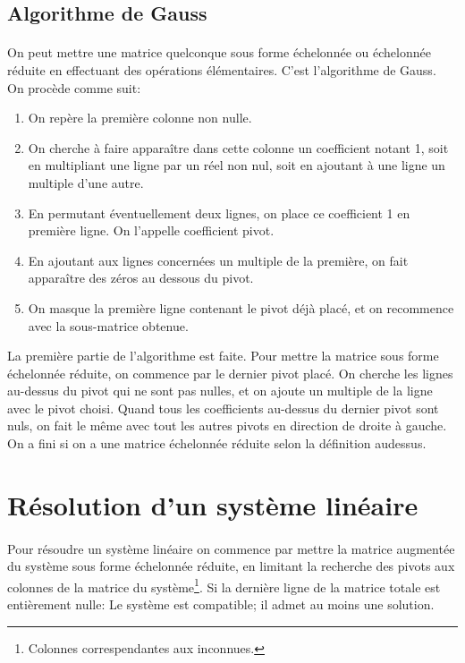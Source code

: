 %
\subsection{Algorithme de Gauss}
%
\paragraph{} On peut mettre une matrice quelconque sous forme échelonnée ou échelonnée réduite en effectuant des opérations élémentaires. C'est l'algorithme de Gauss. \\
On procède comme suit:
\begin{enumerate}
  \item On repère la première colonne non nulle.
  \item On cherche à faire apparaître dans cette colonne un coefficient notant 1, soit en multipliant une ligne par un réel non nul, soit en ajoutant à une ligne un multiple d'une autre.
  \item En permutant éventuellement deux lignes, on place ce coefficient 1 en première ligne. On l'appelle coefficient pivot.
  \item En ajoutant aux lignes concernées un multiple de la première, on fait apparaître des zéros au dessous du pivot. 
  \item On masque la première ligne contenant le pivot déjà placé, et on recommence avec la sous-matrice obtenue.
\end{enumerate}
La première partie de l'algorithme est faite. Pour mettre la matrice sous forme échelonnée réduite, on commence par le dernier pivot placé. On cherche les lignes au-dessus du pivot qui ne sont pas nulles, et on ajoute un multiple de la ligne avec le pivot choisi. Quand tous les coefficients au-dessus du dernier pivot sont nuls, on fait le même avec tout les autres pivots en direction de droite à gauche. On a fini si on a une matrice échelonnée réduite selon la définition audessus.

%
\section{Résolution d'un système linéaire}
%
%
\paragraph{} Pour résoudre un système linéaire on commence par mettre la matrice augmentée du système sous forme échelonnée réduite, en limitant la recherche des pivots aux colonnes de la matrice du système\footnote{Colonnes correspendantes aux inconnues.}.
Si la dernière ligne de la matrice totale est entièrement nulle: Le système est compatible; il admet au moins une solution.
